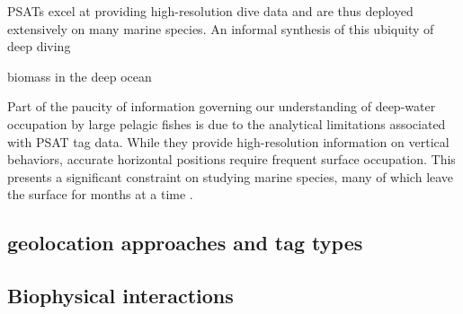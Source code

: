 PSATs excel at providing high-resolution dive data and are thus deployed extensively on many marine species. An informal synthesis of this 
ubiquity of deep diving

biomass in the deep ocean

Part of the paucity of information governing our understanding of deep-water occupation by large pelagic fishes is due to the analytical limitations associated with PSAT tag data. While they provide high-resolution information on vertical behaviors, accurate horizontal positions require frequent surface occupation. This presents a significant constraint on studying marine species, many of which leave the surface for months at a time \citep{Skomal2009}.













\subsection{geolocation approaches and tag types}



\subsection{Biophysical interactions}

